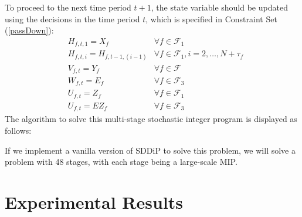 \documentclass[12pt]{article}
\begin{document}
	To proceed to the next time period \(t+1\), the state variable should be updated using the decisions in the time period \(t\), which is specified in Constraint Set (\ref{passDown}):
	\begin{align*}
		& H_{f,t,1} = X_f & \forall f \in \mathcal{F}_1\\
		& H_{f,t,i} = H_{f,t-1,(i-1)} & \forall f \in \mathcal{F}_1, i = 2, \dots, N+\tau_f\\
		& V_{f,t} = Y_f & \forall f \in \mathcal{F}\\
		& W_{f,t} = E_f & \forall f \in \mathcal{F}_3\\
		& U_{f,t} = Z_f & \forall f \in \mathcal{F}_1\\
		& U_{f,t} = EZ_f & \forall f \in \mathcal{F}_3
	\end{align*}
	The algorithm to solve this multi-stage stochastic integer program is displayed as follows:\\
	\begin{algorithm}[H]
		
	\end{algorithm}
	\noindent If we implement a vanilla version of SDDiP to solve this problem, we will solve a problem with 48 stages, with each stage being a large-scale MIP. 
\section{Experimental Results}

\nocite{*}


\end{document}
